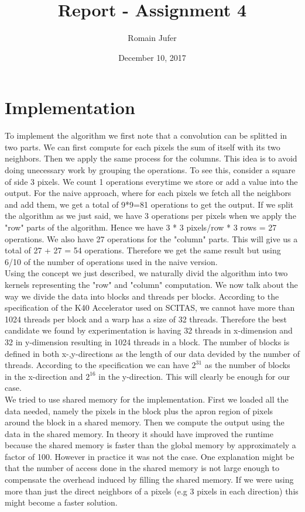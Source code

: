 \documentclass{article}
\title{Report - Assignment 4}
\date{December 10, 2017}
\author{Romain Jufer}
\begin{document}
\maketitle

\section{Implementation}
To implement the algorithm we first note that a convolution can be splitted in two parts. We can first compute for each pixels the sum of itself with its two neighbors. Then we apply the same process for the columns. This idea is to avoid doing unecessary work by grouping the operations. To see this, consider a square of side 3 pixels. We count 1 operations everytime we store or add a value into the output. For the naive approach, where for each pixels we fetch all the neighbors and add them, we get a total of 9*9=81 operations to get the output. If we split the algorithm as we just said, we have 3 operations per pixels when we apply the "row" parts of the algorithm. Hence we have 3 * 3 pixels/row * 3 rows = 27 operations. We also have 27 operations for the "column" parts. This will give us a total of 27 + 27 = 54 operations. Therefore we get the same result but using 6/10 of the number of operations used in the naive version. \\

Using the concept we just described, we naturally divid the algorithm into two kernels representing the "row" and "column" computation. We now talk about the way we divide the data into blocks and threads per blocks. According to the specification of the K40 Accelerator used on SCITAS, we cannot have more than 1024 threads per block and a warp has a size of 32 threads. Therefore the best candidate we found by experimentation is having 32 threads in x-dimension and 32 in y-dimension resulting in 1024 threads in a block. The number of blocks is defined in both x-,y-directions as the length of our data devided by the number of threads. According to the specification we can have $2^{31}$ as the number of blocks in the x-direction and $2^{16}$ in the y-direction. This will clearly be enough for our case. \\

We tried to use shared memory for the implementation. First we loaded all the data needed, namely the pixels in the block plus the apron region of pixels around the block in a shared memory. Then we compute the output using the data in the shared memory. In theory it should have improved the runtime because the shared memory is faster than the global memory by approximately a factor of 100. However in practice it was not the case. One explanation might be that the number of access done in the shared memory is not large enough to compensate the overhead induced by filling the shared memory. If we were using more than just the direct neighbors of a pixels (e.g 3 pixels in each direction) this might become a faster solution. \\
\end{document}
